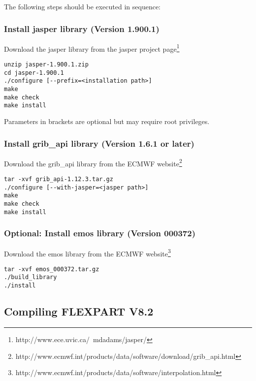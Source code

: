 \documentclass{egu}            %
\begin{document}
\noindent The following steps should be executed in sequence:

\subsubsection{Install jasper library (Version 1.900.1)}

Download the jasper library from the jasper project page\footnote{http://www.ece.uvic.ca/~mdadams/jasper/} 

\begin{small}
\begin{verbatim}
unzip jasper-1.900.1.zip
cd jasper-1.900.1
./configure [--prefix=<installation path>]
make
make check
make install
\end{verbatim}
\end{small}

Parameters in brackets are optional but may require root privileges.  

\subsubsection{Install grib\_api library (Version 1.6.1 or later)}
  
Download the grib\_api library from the ECMWF
website\footnote{http://www.ecmwf.int/products/data/software/download/grib\_api.html}

\begin{small}
\begin{verbatim}
tar -xvf grib_api-1.12.3.tar.gz
./configure [--with-jasper=<jasper path>]
make
make check
make install
\end{verbatim}
\end{small}

\subsubsection{Optional: Install emos library (Version 000372)}

Download the emos library from the ECMWF
website\footnote{http://www.ecmwf.int/products/data/software/interpolation.html}

\begin{small}
\begin{verbatim}
tar -xvf emos_000372.tar.gz
./build_library
./install
\end{verbatim}
\end{small}

\subsection{Compiling FLEXPART V8.2}
\end{document}
